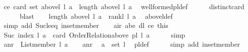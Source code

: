 \begin{isabellebody}
\ ce{\isacharcolon}{\kern0pt}\ {\isachardoublequoteopen}card\ {\isacharparenleft}{\kern0pt}set\ {\isacharparenleft}{\kern0pt}above{\isacharunderscore}{\kern0pt}l\ l\ a{\isacharparenright}{\kern0pt}{\isacharparenright}{\kern0pt}\ {\isacharequal}{\kern0pt}\ length\ {\isacharparenleft}{\kern0pt}above{\isacharunderscore}{\kern0pt}l\ l\ a{\isacharparenright}{\kern0pt}{\isachardoublequoteclose}\ \isamarkupfalse%
\ well{\isacharunderscore}{\kern0pt}formed{\isacharunderscore}{\kern0pt}pl{\isacharunderscore}{\kern0pt}def\isanewline
\ \ \ \ \isamarkupfalse%
\ distinct{\isacharunderscore}{\kern0pt}card\isanewline
\ \ \ \ \isamarkupfalse%
\ blast\isanewline
\ \ \isamarkupfalse%
\ {\isachardoublequoteopen}length\ {\isacharparenleft}{\kern0pt}above{\isacharunderscore}{\kern0pt}l\ l\ a{\isacharparenright}{\kern0pt}\ {\isacharequal}{\kern0pt}\ rank{\isacharunderscore}{\kern0pt}l\ l\ a{\isachardoublequoteclose}\ \isamarkupfalse%
\ above{\isacharunderscore}{\kern0pt}l{\isacharunderscore}{\kern0pt}def\isanewline
\ \ \ \ \isamarkupfalse%
\ {\isacharparenleft}{\kern0pt}simp\ add{\isacharcolon}{\kern0pt}\ Suc{\isacharunderscore}{\kern0pt}le{\isacharunderscore}{\kern0pt}eq\ in{\isacharunderscore}{\kern0pt}set{\isacharunderscore}{\kern0pt}member{\isacharparenright}{\kern0pt}\isanewline
\ \ \isamarkupfalse%
\ air\ abe\ dl\ ce\ this\ \isamarkupfalse%
\ {\isachardoublequoteopen}Suc\ {\isacharparenleft}{\kern0pt}index\ l\ a{\isacharparenright}{\kern0pt}\ {\isacharequal}{\kern0pt}\ card\ {\isacharparenleft}{\kern0pt}Order{\isacharunderscore}{\kern0pt}Relation{\isachardot}{\kern0pt}above\ {\isacharparenleft}{\kern0pt}pl{\isacharunderscore}{\kern0pt}{\isasymalpha}\ l{\isacharparenright}{\kern0pt}\ a{\isacharparenright}{\kern0pt}{\isachardoublequoteclose}\isanewline
\ \ \ \ \isamarkupfalse%
\ simp\isanewline
{}\isamarkupfalse%
\isanewline
\ \ \isamarkupfalse%
\ anr{\isacharcolon}{\kern0pt}\ {\isachardoublequoteopen}{\isasymnot}\ List{\isachardot}{\kern0pt}member\ l\ a{\isachardoublequoteclose}\isanewline
\ \ \isamarkupfalse%
\ anr\ \isamarkupfalse%
\ {\isachardoublequoteopen}a\ {\isasymnotin}\ {\isacharparenleft}{\kern0pt}set\ l{\isacharparenright}{\kern0pt}{\isachardoublequoteclose}\ \isamarkupfalse%
\ pl{\isacharunderscore}{\kern0pt}{\isasymalpha}{\isacharunderscore}{\kern0pt}def\isanewline
\ \ \ \ \isamarkupfalse%
\ {\isacharparenleft}{\kern0pt}simp\ add{\isacharcolon}{\kern0pt}\ in{\isacharunderscore}{\kern0pt}set{\isacharunderscore}{\kern0pt}member{\isacharparenright}{\kern0pt}\ \isanewline

\end{isabellebody}
